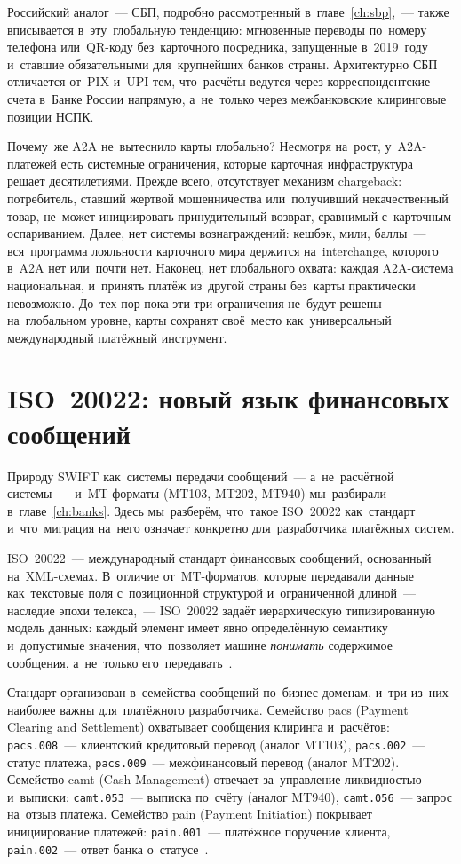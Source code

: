 Российский аналог~--- СБП, подробно рассмотренный в~главе~\ref{ch:sbp},~---
также вписывается в~эту~глобальную тенденцию: мгновенные переводы по~номеру
телефона или~QR-коду без~карточного посредника, запущенные в~2019~году
и~ставшие обязательными для~крупнейших банков страны. Архитектурно
СБП отличается от~PIX и~UPI тем, что~расчёты ведутся через корреспондентские
счета в~Банке России напрямую, а~не~только через межбанковские клиринговые
позиции НСПК.

Почему~же A2A не~вытеснило карты глобально? Несмотря на~рост,
у~A2A-платежей есть системные ограничения, которые карточная
инфраструктура решает десятилетиями. Прежде всего, отсутствует механизм
chargeback: потребитель, ставший жертвой мошенничества или~получивший
некачественный товар, не~может инициировать принудительный возврат,
сравнимый с~карточным оспариванием. Далее, нет системы вознаграждений:
кешбэк, мили, баллы~--- вся~программа лояльности карточного мира
держится на~interchange, которого в~A2A нет или~почти нет. Наконец,
нет глобального охвата: каждая A2A-система национальная, и~принять
платёж из~другой страны без~карты практически невозможно. До~тех пор
пока эти три ограничения не~будут решены на~глобальном уровне, карты
сохранят своё~место как~универсальный международный платёжный инструмент.


\section{ISO~20022: новый язык финансовых сообщений}
\label{sec:iso20022}

Природу SWIFT как~системы передачи сообщений~--- а~не~расчётной системы~---
и~MT-форматы (MT103, MT202, MT940) мы~разбирали в~главе~\ref{ch:banks}.
Здесь мы~разберём, что~такое ISO~20022 как~стандарт и~что~миграция
на~него означает конкретно для~разработчика платёжных систем.

ISO~20022~--- международный стандарт финансовых сообщений, основанный
на~XML-схемах. В~отличие от~MT-форматов, которые передавали данные
как~текстовые поля с~позиционной структурой и~ограниченной длиной~---
наследие эпохи телекса,~--- ISO~20022 задаёт иерархическую типизированную
модель данных: каждый элемент имеет явно определённую семантику
и~допустимые значения, что~позволяет машине \emph{понимать} содержимое
сообщения, а~не~только его~передавать~.

Стандарт организован в~семейства сообщений по~бизнес-доменам, и~три
из~них наиболее важны для~платёжного разработчика. Семейство pacs
(Payment Clearing and Settlement) охватывает сообщения клиринга
и~расчётов: \texttt{pacs.008}~--- клиентский кредитовый перевод
(аналог MT103), \texttt{pacs.002}~--- статус платежа,
\texttt{pacs.009}~--- межфинансовый перевод (аналог MT202).
Семейство camt (Cash Management) отвечает за~управление ликвидностью
и~выписки: \texttt{camt.053}~--- выписка по~счёту (аналог MT940),
\texttt{camt.056}~--- запрос на~отзыв платежа. Семейство pain
(Payment Initiation) покрывает инициирование платежей:
\texttt{pain.001}~--- платёжное поручение клиента,
\texttt{pain.002}~--- ответ банка о~статусе~.

